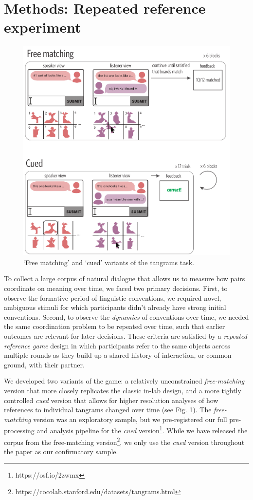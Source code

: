 \documentclass[alpha-refs]{wiley-article}
\begin{document}
\section{Methods: Repeated reference experiment}

\begin{figure}
\centering
\includegraphics[scale=.9]{designAndExample.pdf}
\caption{`Free matching' and `cued' variants of the tangrams task.}
\label{fig:design}
\end{figure}

To collect a large corpus of natural dialogue that allows us to measure how pairs coordinate on meaning over time, we faced two primary decisions.
First, to observe the formative period of linguistic conventions, we required novel, ambiguous stimuli for which participants didn't already have strong initial conventions.
Second, to observe the \emph{dynamics} of conventions over time, we needed the same coordination problem to be repeated over time, such that earlier outcomes are relevant for later decisions.
These criteria are satisfied by a \emph{repeated reference game} design in which participants refer to the same objects across multiple rounds as they build up a shared history of interaction, or common ground, with their partner. 

We developed two variants of the game: a relatively unconstrained \emph{free-matching} version that more closely replicates the classic in-lab design, and a more tightly controlled \emph{cued} version that allows for higher resolution analyses of how references to individual tangrams changed over time (see Fig. \ref{fig:design}). 
The \emph{free-matching} version was an exploratory sample, but we pre-registered our full pre-processing and analysis pipeline for the \emph{cued} version\footnote{https://osf.io/2zwmx}. 
While we have released the corpus from the free-matching version\footnote{https://cocolab.stanford.edu/datasets/tangrams.html}, we only use the \emph{cued} version throughout the paper as our confirmatory sample.
\end{document}
